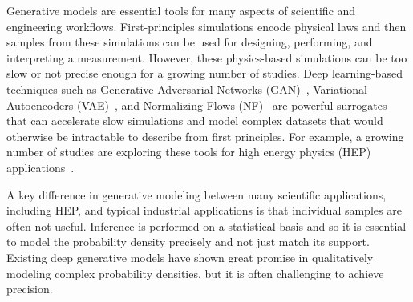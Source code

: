Generative models are essential tools for many aspects of scientific and engineering workflows. First-principles simulations encode physical laws and then samples from these simulations can be used for designing, performing, and interpreting a measurement. However, these physics-based simulations can be too slow or not precise enough for a growing number of studies. Deep learning-based techniques such as Generative Adversarial Networks (GAN)~\cite{goodfellow,Creswell2018}, Variational Autoencoders (VAE)~\cite{kingma2014autoencoding,Kingma2019}, and Normalizing Flows (NF)~\cite{10.5555/3045118.3045281,nflow_review} are powerful surrogates that can accelerate slow simulations and model complex datasets that would otherwise be intractable to describe from first principles. For example, a growing number of studies are exploring these tools for high energy physics (HEP) applications~\cite{by_example,calogan1,calogan2,Alonso-Monsalve:2018aqs,Butter:2019eyo,Martinez:2019jlu,fcgan,Vallecorsa:2019ked,SHiP:2019gcl,Carrazza:2019cnt,gan_phasespace,bsm_gan,DijetGAN2,gan_datasets,Chekalina:2018hxi,ATL-SOFT-PUB-2018-001,Zhou:2018ill,Carminati:2018khv,Vallecorsa:2018zco,Datta:2018mwd,fast_accurate,aachen_wgan1,Deja:2019vcv,Derkach:2019qfk,Erbin:2018csv,aachen_wgan2,Urban:2018tqv,Oliveira:DLPS2017,deOliveira:2017rwa,Farrell:2019fsm,Hooberman:DLPS2017,Belayneh:2019vyx,Buhmann:2020pmy,Alanazi:2020jod,2009.03796,Kansal:2020svm,Maevskiy:2020ank,Lai:2020byl,Choi:2021sku,Rehm:2021zow,Rehm:2021zoz,Carrazza:2021hny,Albergo:2019eim,Kanwar:2003.06413,Brehmer:2020vwc,Bothmann:2020ywa,Gao:2020zvv,Gao:2020vdv,Nachman:2020lpy,Choi:2020bnf,Lu:2020npg,Bieringer:2020tnw,Hollingsworth:2021sii,Monk:2018zsb,Cheng:2020dal,Dohi:2020eda,Howard:2021pos,Buhmann:2021lxj,Bortolato:2021zic,deja2020endtoend,Hariri:2021clz,Fanelli:2019qaq, Bellagente:2020piv, Bellagente:2021yyh}.

A key difference in generative modeling between many scientific applications, including HEP, and typical industrial applications is that individual samples are often not useful. Inference is performed on a statistical basis and so it is essential to model the probability density precisely and not just match its support. Existing deep generative models have shown great promise in qualitatively modeling complex probability densities, but it is often challenging to achieve precision.

